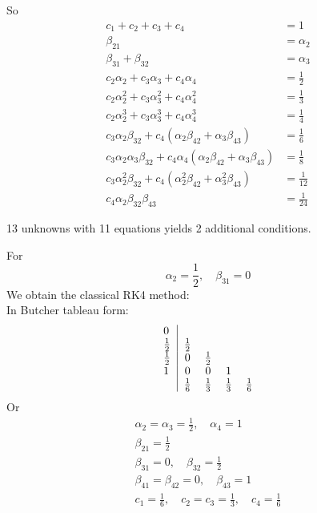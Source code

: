 \documentclass[10pt]{amsart}
\begin{document}
\begin{multicols*}{2}
So
\begin{equation}
\begin{aligned}
	c_1 + c_2 + c_3 + c_4 & = 1 \\
	\beta_{21} & = \alpha_2 \\
	\beta_{31} + \beta_{32} & = \alpha_3 \\
	c_2 \alpha_2 + c_3 \alpha_3 + c_4 \alpha_4 & = \frac{1}{2} \\
	c_2 \alpha_2^2 + c_3 \alpha_3^2 + c_4 \alpha_4^2 & = \frac{1}{3} \\
	c_2 \alpha_2^3 + c_3 \alpha_3^3 + c_4 \alpha_4^3 & = \frac{1}{4} \\
	c_3 \alpha_2 \beta_{32} + c_4 (\alpha_2 \beta_{42} + \alpha_3 \beta_{43}) & = \frac{1}{6} \\
	c_3 \alpha_2 \alpha_3 \beta_{32} + c_4 \alpha_4 (\alpha_2 \beta_{42} + \alpha_3 \beta_{43}) & = \frac{1}{8} \\
	c_3 \alpha_2^2  \beta_{32} + c_4  (\alpha_2^2 \beta_{42} + \alpha_3^2 \beta_{43}) & = \frac{1}{12} \\
	c_4 \alpha_2 \beta_{32} \beta_{43} & = \frac{1}{24}
\end{aligned}
\end{equation}

13 unknowns with 11 equations yields 2 additional conditions.

For
\[
\alpha_2 = \frac{1}{2}, \quad \beta_{31} =0 
\]
We obtain the classical RK4 method: \\

In Butcher tableau form:
\[
\begin{tabular}{ l|c c c c }
	0 & & & &  \\
	$\frac{1}{2}$ & $\frac{1}{2}$ &  & &  \\ 
	$\frac{1}{2}$ & $0$ & $\frac{1}{2}$ & &  \\ 
	$1$ & $0$ & $0$ & 1 &  \\
	& $\frac{1}{6}$ & $\frac{1}{3}$ & $\frac{1}{3}$ & $\frac{1}{6}$  \\
\end{tabular}
\]
Or
\[
\begin{gathered}
	\alpha_2 = \alpha_3 = \frac{1}{2}, \quad \alpha_4 = 1 \\
	\beta_{21} = \frac{1}{2} \\
	\beta_{31} = 0, \quad \beta_{32} = \frac{1}{2} \\
	\beta_{41} = \beta_{42} = 0, \quad \beta_{43}=1 \\
	c_1 = \frac{1}{6}, \quad c_2 = c_3 = \frac{1}{3}, \quad c_4 = \frac{1}{6}
\end{gathered}
\]


\end{multicols*}
\end{document}
